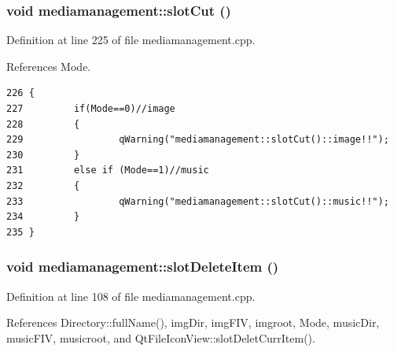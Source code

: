 \subsubsection{\setlength{\rightskip}{0pt plus 5cm}void mediamanagement::slot\-Cut ()\hspace{0.3cm}{\tt  [slot]}}\label{classmediamanagement_mediamanagementi3}




Definition at line 225 of file mediamanagement.cpp.

References Mode.



\footnotesize\begin{verbatim}226 {
227         if(Mode==0)//image
228         {
229                 qWarning("mediamanagement::slotCut()::image!!");
230         }
231         else if (Mode==1)//music
232         {
233                 qWarning("mediamanagement::slotCut()::music!!");
234         }
235 }
\end{verbatim}\normalsize 
{}
\subsubsection{\setlength{\rightskip}{0pt plus 5cm}void mediamanagement::slot\-Delete\-Item ()\hspace{0.3cm}{\tt  [slot]}}\label{classmediamanagement_mediamanagementi1}




Definition at line 108 of file mediamanagement.cpp.

References Directory::full\-Name(), img\-Dir, img\-FIV, imgroot, Mode, music\-Dir, music\-FIV, musicroot, and Qt\-File\-Icon\-View::slot\-Delet\-Curr\-Item().



